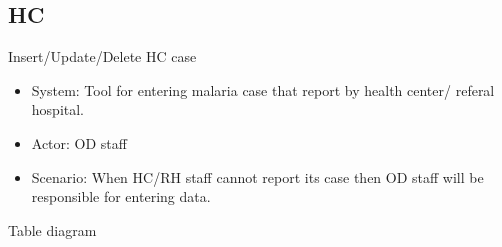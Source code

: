 \documentclass[letterpaper,10pt,english,openany,oneside]{sphinxmanual}
\begin{document}
\subsection{HC}
\label{\detokenize{module/module:hc}}
\sphinxAtStartPar
Insert/Update/Delete HC case
\begin{itemize}
\item {} 
\sphinxAtStartPar
System: Tool for entering malaria case that report by health center/ referal hospital.

\item {} 
\sphinxAtStartPar
Actor: OD staff

\item {} 
\sphinxAtStartPar
Scenario: When HC/RH staff cannot report its case then OD staff will be responsible for entering data.

\end{itemize}

\sphinxAtStartPar
Table diagram
\end{document}
